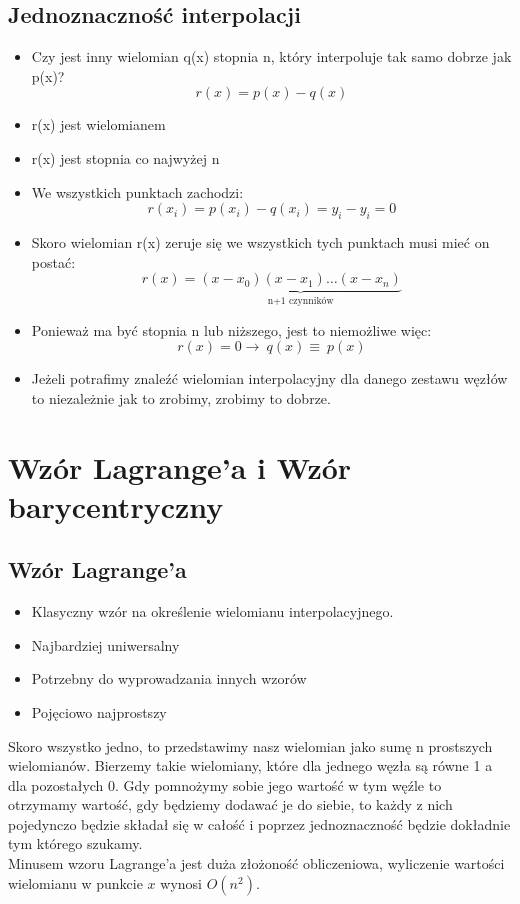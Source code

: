 \documentclass[a4paper]{article}
\begin{document}
\subsection{Jednoznaczność interpolacji}
\begin{itemize}
    \item Czy jest inny wielomian q(x) stopnia n, który interpoluje tak samo dobrze jak p(x)?
    \begin{equation*}
        r(x) = p(x) - q(x)
    \end{equation*}
    \item r(x) jest wielomianem
    \item r(x) jest stopnia co najwyżej n
    \item We wszystkich punktach zachodzi:
    \begin{equation*}
        r(x_i)=p(x_i)-q(x_i)=y_i-y_i=0
    \end{equation*}
    \item Skoro wielomian r(x) zeruje się we wszystkich tych punktach musi mieć on postać:
    \begin{equation*}
        r(x) = \underbrace{(x-x_0)(x-x_1)\ldots(x-x_n)}_{\text{n+1 czynników}}
    \end{equation*}
    \item Ponieważ ma być stopnia n lub niższego, jest to niemożliwe więc:
    \begin{equation*}
        r(x)=0\rightarrow\ q(x)\equiv\ p(x)
    \end{equation*}
    \item Jeżeli potrafimy znaleźć wielomian interpolacyjny dla danego zestawu węzłów to niezależnie jak to zrobimy, zrobimy to dobrze.
\end{itemize}

\section{Wzór Lagrange'a i Wzór barycentryczny}

\subsection{Wzór Lagrange'a}
\begin{itemize}
    \item Klasyczny wzór na określenie wielomianu interpolacyjnego.
    \item Najbardziej uniwersalny
    \item Potrzebny do wyprowadzania innych wzorów
    \item Pojęciowo najprostszy
\end{itemize}
Skoro wszystko jedno, to przedstawimy nasz wielomian jako sumę n prostszych wielomianów. Bierzemy takie wielomiany, które dla jednego węzła są równe 1 a dla pozostałych 0. Gdy pomnożymy sobie jego wartość w tym węźle to otrzymamy wartość, gdy będziemy dodawać je do siebie, to każdy z nich pojedynczo będzie składał się w całość i poprzez jednoznaczność będzie dokładnie tym którego szukamy. \\
Minusem wzoru Lagrange’a jest duża złożoność obliczeniowa, wyliczenie wartości wielomianu w punkcie $x$ wynosi $O(n^2)$.
\end{document}
